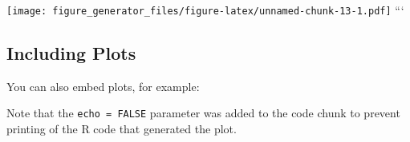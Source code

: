 \documentclass[]{article}
\begin{document}
\texttt{[image: figure\_generator\_files/figure-latex/unnamed-chunk-13-1.pdf]}
```

\subsection{Including Plots}\label{including-plots}

You can also embed plots, for example:

Note that the \texttt{echo\ =\ FALSE} parameter was added to the code
chunk to prevent printing of the R code that generated the plot.
\end{document}
